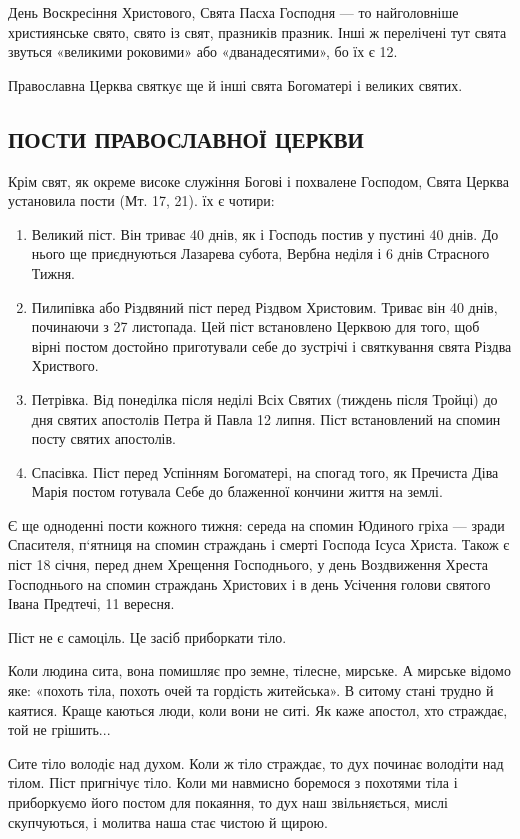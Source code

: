 \documentclass[main.tex]{subfiles}
\begin{document}
День Воскресіння Христового, Свята Пасха Господня — то найголовніше християнське свято, свято із свят, празників празник. Інші ж перелічені тут свята звуться «великими роковими» або «дванадесятими», бо їх є 12.

Православна Церква святкує ще й інші свята Богоматері і великих святих.

\subsection{ПОСТИ ПРАВОСЛАВНОЇ ЦЕРКВИ}

Крім свят, як окреме високе служіння Богові і похвалене Господом, Свята Церква установила пости (Мт. 17, 21). їх є чотири:

\begin{enumerate}
    \item Великий піст. Він триває 40 днів, як і Господь постив у пустині 40 днів. До нього ще приєднуються Лазарева
    субота, Вербна неділя і 6 днів Страсного Тижня.
    \item Пилипівка або Різдвяний піст перед Різдвом Христовим. Триває він 40 днів, починаючи з 27 листопада. Цей піст встановлено Церквою для того, щоб вірні постом достойно приготували себе до зустрічі і святкування свята Різдва Христвого.
    \item Петрівка. Від понеділка після неділі Всіх Святих (тиждень після Тройці) до дня святих апостолів Петра й Павла 12 липня. Піст встановлений на спомин посту святих апостолів.
    \item Спасівка. Піст перед Успінням Богоматері, на спогад того, як Пречиста Діва Марія постом готувала Себе до блаженної кончини життя на землі.
\end{enumerate}

Є ще одноденні пости кожного тижня: середа на спомин Юдиного гріха — зради Спасителя, п`ятниця на спомин страждань і смерті Господа Ісуса Христа.
Також є піст 18 січня, перед днем Хрещення Господнього, у день Воздвиження Хреста Господнього на спомин страждань Христових і в день Усічення голови святого Івана Предтечі, 11 вересня.

Піст не є самоціль. Це засіб приборкати тіло.

Коли людина сита, вона помишляє про земне, тілесне, мирське. А мирське відомо яке: «похоть тіла, похоть очей та гордість житейська». В ситому стані трудно й каятися. Краще каються люди, коли вони не ситі. Як каже апостол, хто страждає, той не грішить...

Сите тіло володіє над духом. Коли ж тіло страждає, то дух починає володіти над тілом. Піст пригнічує тіло. Коли ми навмисно боремося з похотями тіла і приборкуємо його постом для покаяння, то дух наш звільняється, мислі скупчуються, і молитва наша стає чистою й щирою.
\end{document}
